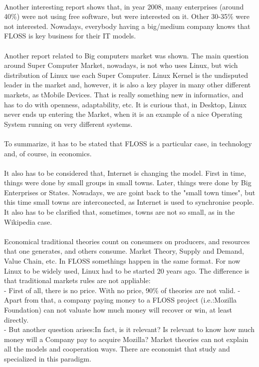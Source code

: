 \\
Another interesting report shows that, in year 2008, many enterprises (around 40\%) were not using free software, but were interested on it. Other 30-35\% were not interested. Nowadays, everybody having a big/medium company knows that FLOSS is key business for their IT models.\\
\\
Another report related to Big computers market was shown. The main question around Super Computer Market, nowadays, is not who uses Linux, but wich distribution of Linux use each Super Computer. Linux Kernel is the undisputed leader in the market and, however, it is also a key player in many other different markets, as tMobile Devices. That is really something new in informatics, and has to do with openness, adaptability, etc. It is curious that, in Desktop, Linux never ends up entering the Market, when it is an example of a nice Operating System running on very different systems.\\
\\
To summarize, it has to be stated that FLOSS is a particular case, in technology and, of course, in economics.\\\\
It also has to be considered that, Internet is changing the model. First in time, things were done by small groups in small towns. Later, things were done by Big Enterprises or States. Nowadays, we are goint back to the "small town times", but this time small towns are interconected, as Internet is used to synchronise people. It also has to be clarified that,  sometimes, towns are not so small, as in the Wikipedia case.\\
\\
Economical traditional theories count on consumers on producers, and resources that one generates, and others consume. Market Theory, Supply and Demand, Value Chain, etc. In FLOSS somethings happen in the same format. For now Linux to be widely used, Linux had to be started 20 years ago. The difference is that traditional markets rules are not appliable:\\
- First of all, there is no price. With no price, 90\% of theories are not valid. 
- Apart from that, a company paying money to a FLOSS project (i.e.:Mozilla Foundation) can not valuate how much money will recover or win, at least directly.\\ 
- But another question arises:In fact, is it relevant? Is relevant to know how much money will a Company pay to acquire Mozilla? Market theories can not explain all the models and cooperation ways. There are economist that study and specialized in this paradigm.\\
\\

